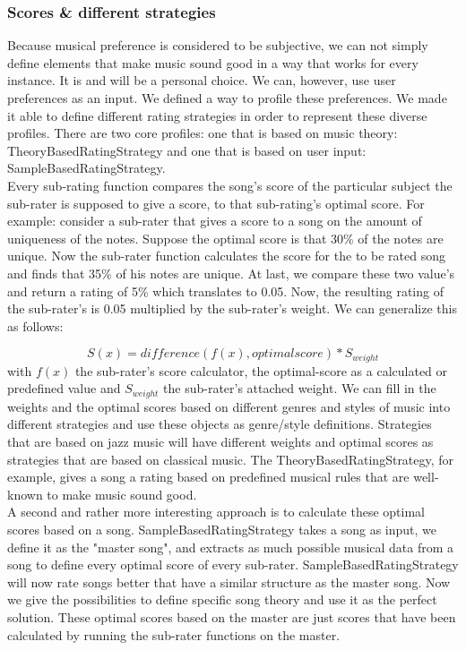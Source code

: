 \documentclass[a4paper]{article}
\begin{document}
\subsubsection{Scores \& different strategies}
Because musical preference is considered to be subjective, we can not simply define elements that make music sound good in a way that works for every instance. It is and will be a personal choice. We can, however, use user preferences as an input. We defined a way to profile these preferences. We made it able to define different rating strategies in order to represent these diverse profiles. There are two core profiles: one that is based on music theory: TheoryBasedRatingStrategy and one that is based on user input: SampleBasedRatingStrategy. \\
\newline
Every sub-rating function compares the song's score of the particular subject the sub-rater is supposed to give a score, to that sub-rating's optimal score. For example: consider a sub-rater that gives a score to a song on the amount of uniqueness of the notes. Suppose the optimal score is that 30\% of the notes are unique. Now the sub-rater function calculates the score for the to be rated song and finds that 35\% of his notes are unique. At last, we compare these two value's and return a rating of 5\% which translates to 0.05. Now, the resulting rating of the sub-rater's is 0.05 multiplied by the sub-rater's weight. We can generalize this as follows:

\[ S(x) =  difference( f(x) ,optimalscore) * S_{weight} \]
with $ f(x)$ the sub-rater's score calculator, the optimal-score as a calculated or predefined value and $  S_{weight} $ the sub-rater's attached weight.
\newline
We can fill in the weights and the optimal scores based on different genres and styles of music into different strategies and use these objects as genre/style definitions. Strategies that are based on jazz music will have different weights and optimal scores as strategies that are based on classical music. The TheoryBasedRatingStrategy, for example, gives a song a rating based on predefined musical rules that are well-known to make music sound good.\\
A second and rather more interesting approach is to calculate these optimal scores based on a song. SampleBasedRatingStrategy takes a song as input, we define it as the "master song", and extracts as much possible musical data from a song to define every optimal score of every sub-rater. SampleBasedRatingStrategy will now rate songs better that have a similar structure as the master song. Now we give the possibilities to define specific song theory and use it as the perfect solution. These optimal scores based on the master are just scores that have been calculated by running the sub-rater functions on the master.
\end{document}
